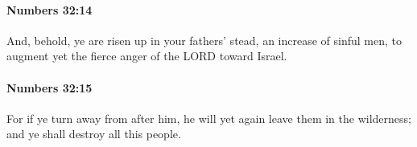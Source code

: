 		\paragraph{Numbers 32:14} %
			\label{NUMBERS-32-14}

			And, behold, ye are risen up in your fathers’ stead, an increase of sinful men, to augment yet the fierce anger of the LORD toward Israel.


		\paragraph{Numbers 32:15} %
			\label{NUMBERS-32-15}

			For if ye turn away from after him, he will yet again leave them in the wilderness; and ye shall destroy all this people.


